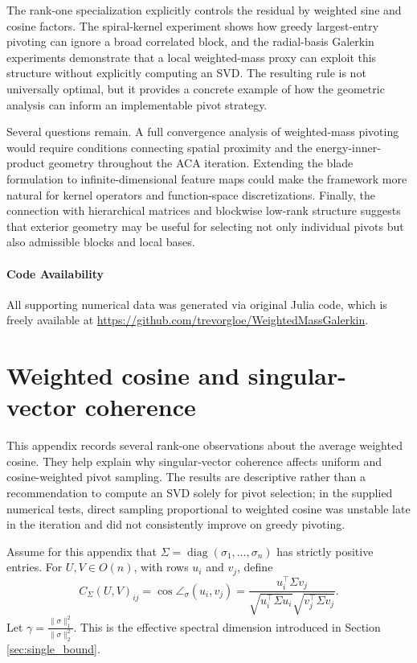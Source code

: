 \documentclass[11pt, preprint]{article}
\begin{document}
The rank-one specialization explicitly controls the residual by weighted sine and cosine factors. The spiral-kernel experiment shows how greedy largest-entry pivoting can ignore a broad correlated block, and the radial-basis Galerkin experiments demonstrate that a local weighted-mass proxy can exploit this structure without explicitly computing an SVD. The resulting rule is not universally optimal, but it provides a concrete example of how the geometric analysis can inform an implementable pivot strategy.

Several questions remain. A full convergence analysis of weighted-mass pivoting would require conditions connecting spatial proximity and the energy-inner-product geometry throughout the ACA iteration. Extending the blade formulation to infinite-dimensional feature maps could make the framework more natural for kernel operators and function-space discretizations. Finally, the connection with hierarchical matrices and blockwise low-rank structure \cite{Borm_IntroductionHierarchicalMatrices2003} suggests that exterior geometry may be useful for selecting not only individual pivots but also admissible blocks and local bases.

\paragraph{Code Availability}
All supporting numerical data was generated via original Julia code, which is freely available at \url{https://github.com/trevorgloe/WeightedMassGalerkin}.

\printbibliography

\appendix

\section{Weighted cosine and singular-vector coherence}\label{apx:cosine_vs_coherence}

This appendix records several rank-one observations about the average weighted cosine. They help explain why singular-vector coherence affects uniform and cosine-weighted pivot sampling. The results are descriptive rather than a recommendation to compute an SVD solely for pivot selection; in the supplied numerical tests, direct sampling proportional to weighted cosine was unstable late in the iteration and did not consistently improve on greedy pivoting.

Assume for this appendix that $\Sigma=\operatorname{diag}(\sigma_1,\ldots,\sigma_n)$ has strictly positive entries. For $U,V\in O(n)$, with rows $u_i$ and $v_j$, define
\[
C_\Sigma(U,V)_{ij}
=
\cos\angle_\sigma(u_i,v_j)
=
\frac{u_i^\top\Sigma v_j}
{\sqrt{u_i^\top\Sigma u_i}\sqrt{v_j^\top\Sigma v_j}}.
\]
Let
\(
\gamma
=
\frac{\|\sigma\|_1^2}{\|\sigma\|_2^2}.
\)
This is the effective spectral dimension introduced in Section \ref{sec:single_bound}.
\end{document}
